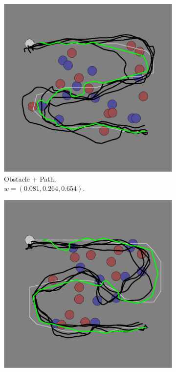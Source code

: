 \documentclass[11pt]{article} %
\begin{document}
\begin{figure}[h]
\begin{subfigure}[b]{0.24\textwidth}
\includegraphics[width=\textwidth]{task_2.png}
\caption{Obstacle + Path,\\$w = (0.081, 0.264, 0.654)$. }
\end{subfigure}
\begin{subfigure}[b]{0.24\textwidth}
\includegraphics[width=\textwidth]{task_3.png}

\end{subfigure}
\end{figure}
\end{document}
